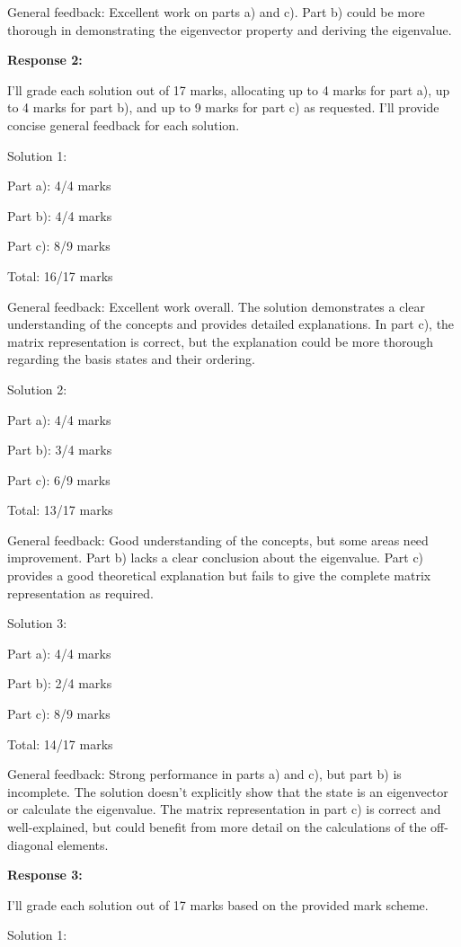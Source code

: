 \documentclass[a4paper,11pt]{article}
\begin{document}
General feedback: Excellent work on parts a) and c). Part b) could be more thorough in demonstrating the eigenvector property and deriving the eigenvalue.

\bigskip   
\textbf{Response 2:}

I'll grade each solution out of 17 marks, allocating up to 4 marks for part a), up to 4 marks for part b), and up to 9 marks for part c) as requested. I'll provide concise general feedback for each solution.

Solution 1:

Part a): 4/4 marks

Part b): 4/4 marks

Part c): 8/9 marks

Total: 16/17 marks

General feedback: Excellent work overall. The solution demonstrates a clear understanding of the concepts and provides detailed explanations. In part c), the matrix representation is correct, but the explanation could be more thorough regarding the basis states and their ordering.

Solution 2:

Part a): 4/4 marks

Part b): 3/4 marks

Part c): 6/9 marks

Total: 13/17 marks

General feedback: Good understanding of the concepts, but some areas need improvement. Part b) lacks a clear conclusion about the eigenvalue. Part c) provides a good theoretical explanation but fails to give the complete matrix representation as required.

Solution 3:

Part a): 4/4 marks

Part b): 2/4 marks

Part c): 8/9 marks

Total: 14/17 marks

General feedback: Strong performance in parts a) and c), but part b) is incomplete. The solution doesn't explicitly show that the state is an eigenvector or calculate the eigenvalue. The matrix representation in part c) is correct and well-explained, but could benefit from more detail on the calculations of the off-diagonal elements.

\bigskip   
\textbf{Response 3:}

I'll grade each solution out of 17 marks based on the provided mark scheme.

Solution 1:
\end{document}
